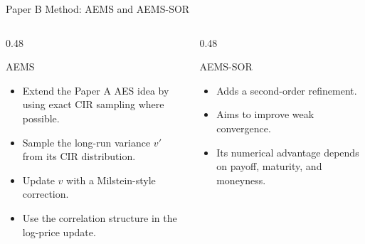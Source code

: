 \begin{frame}{Paper B Method: AEMS and AEMS-SOR}
  \begin{columns}[T,onlytextwidth]
    \begin{column}{0.48\textwidth}
      \begin{block}{AEMS}
        \begin{itemize}
          \item Extend the Paper A AES idea by using exact CIR sampling where possible.
          \item Sample the long-run variance \(v'\) from its CIR distribution.
          \item Update \(v\) with a Milstein-style correction.
          \item Use the correlation structure in the log-price update.
        \end{itemize}
      \end{block}
    \end{column}
    \begin{column}{0.48\textwidth}
      \begin{block}{AEMS-SOR}
        \begin{itemize}
          \item Adds a second-order refinement.
          \item Aims to improve weak convergence.
          \item Its numerical advantage depends on payoff, maturity, and moneyness.
        \end{itemize}
      \end{block}
    \end{column}
  \end{columns}

  \vspace{0.4em}
\end{frame}

